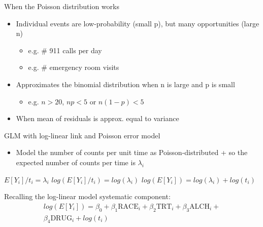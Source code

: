 \documentclass[ignorenonframetext,]{beamer}
\providecommand{\tightlist}{%
  \setlength{\itemsep}{0pt}\setlength{\parskip}{0pt}}
\begin{document}
\begin{frame}{When the Poisson distribution works}
\protect\hypertarget{when-the-poisson-distribution-works}{}

\begin{itemize}
\tightlist
\item
  Individual events are low-probability (small p), but many
  opportunities (large n)

  \begin{itemize}
  \tightlist
  \item
    e.g. \# 911 calls per day
  \item
    e.g. \# emergency room visits
  \end{itemize}
\item
  Approximates the binomial distribution when n is large and p is small

  \begin{itemize}
  \tightlist
  \item
    e.g. \(n > 20\), \(np < 5\) or \(n(1-p) < 5\)
  \end{itemize}
\item
  When mean of residuals is approx. equal to variance
\end{itemize}

\end{frame}

\begin{frame}{GLM with log-linear link and Poisson error model}
\protect\hypertarget{glm-with-log-linear-link-and-poisson-error-model}{}

\begin{itemize}
\tightlist
\item
  Model the number of counts per unit time as Poisson-distributed + so
  the expected number of counts per time is \(\lambda_i\)
\end{itemize}

\(E[Y_i]/t_i = \lambda_i\) \newline \(log(E[Y_i]/t_i) = log(\lambda_i)\)
\newline \(log(E[Y_i]) = log(\lambda_i) + log(t_i)\) \newline

Recalling the log-linear model systematic component: \[
\begin{aligned}
log(E[Y_i]) = \beta_0 + \beta_1 \textrm{RACE}_i + \beta_2 \textrm{TRT}_i + 
\beta_3 \textrm{ALCH}_i + \nonumber \\ \beta_4 \textrm{DRUG}_i + log(t_i)
\end{aligned}
\]

\end{frame}
\end{document}
